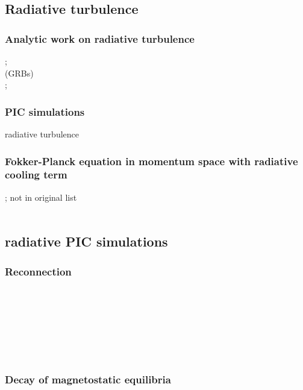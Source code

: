 \documentclass[usenatbib,twocolumn]{aastex63}
\begin{document}
\subsection{Radiative turbulence}

\subsubsection{Analytic work on radiative turbulence}
\citep{Uzdensky_2018}; \\
\citep{Zrake_2018} (GRBs) \\
\citep{Sobacchi_2019}; \\
 
\subsubsection{PIC simulations}
\citep{Zhdankin_2019b} radiative turbulence\\


\subsubsection{Fokker-Planck equation in momentum space with radiative cooling term}
\citep{Schlickeiser_1984, Schlickeiser_1985}; not in original list \citep{Schlickeiser_1989} \\
\citep{Stawarz_2008} \\


\subsection{radiative PIC simulations}

\subsubsection{Reconnection}
\citep{Jaroschek_2009} \\
\citep{Cerutti_2013, Cerutti_2014, Cerutti_2014a} \\
\citep{Kagan_2016, Kagan_2016b} \\
\citep{Hakobyan_2019} \\
\citep{Werner_2019} \\
\citep{Schoeffler_2019} \\

\subsubsection{Decay of magnetostatic equilibria}
\citep{Yuan_2016} \\
\citep{Nalewajko_2018} \\
\end{document}
